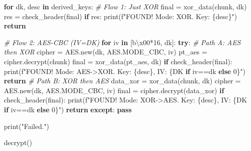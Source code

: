 \documentclass[
]{article}
\newenvironment{Shaded}{}{}
\newcommand{\BuiltInTok}[1]{\textcolor[rgb]{0.00,0.50,0.00}{#1}}
\newcommand{\CharTok}[1]{\textcolor[rgb]{0.25,0.44,0.63}{#1}}
\newcommand{\CommentTok}[1]{\textcolor[rgb]{0.38,0.63,0.69}{\textit{#1}}}
\newcommand{\ControlFlowTok}[1]{\textcolor[rgb]{0.00,0.44,0.13}{\textbf{#1}}}
\newcommand{\DecValTok}[1]{\textcolor[rgb]{0.25,0.63,0.44}{#1}}
\newcommand{\KeywordTok}[1]{\textcolor[rgb]{0.00,0.44,0.13}{\textbf{#1}}}
\newcommand{\NormalTok}[1]{#1}
\newcommand{\OperatorTok}[1]{\textcolor[rgb]{0.40,0.40,0.40}{#1}}
\newcommand{\SpecialCharTok}[1]{\textcolor[rgb]{0.25,0.44,0.63}{#1}}
\newcommand{\SpecialStringTok}[1]{\textcolor[rgb]{0.73,0.40,0.53}{#1}}
\newcommand{\StringTok}[1]{\textcolor[rgb]{0.25,0.44,0.63}{#1}}
\begin{document}
\begin{Shaded}
\begin{Highlighting}[]
    \ControlFlowTok{for}\NormalTok{ dk, desc }\KeywordTok{in}\NormalTok{ derived\_keys:}
        \CommentTok{\# Flow 1: Just XOR}
\NormalTok{        final }\OperatorTok{=}\NormalTok{ xor\_data(chunk, dk)}
\NormalTok{        res }\OperatorTok{=}\NormalTok{ check\_header(final)}
        \ControlFlowTok{if}\NormalTok{ res:}
            \BuiltInTok{print}\NormalTok{(}\SpecialStringTok{f"FOUND! Mode: XOR. Key: }\SpecialCharTok{\{}\NormalTok{desc}\SpecialCharTok{\}}\SpecialStringTok{"}\NormalTok{)}
            \ControlFlowTok{return}
        
        \CommentTok{\# Flow 2: AES{-}CBC (IV=DK)}
        \ControlFlowTok{for}\NormalTok{ iv }\KeywordTok{in}\NormalTok{ [}\StringTok{b\textquotesingle{}}\CharTok{\textbackslash{}x00}\StringTok{\textquotesingle{}}\OperatorTok{*}\DecValTok{16}\NormalTok{, dk]:}
            \ControlFlowTok{try}\NormalTok{:}
                \CommentTok{\# Path A: AES then XOR}
\NormalTok{                cipher }\OperatorTok{=}\NormalTok{ AES.new(dk, AES.MODE\_CBC, iv)}
\NormalTok{                pt\_aes }\OperatorTok{=}\NormalTok{ cipher.decrypt(chunk)}
\NormalTok{                final }\OperatorTok{=}\NormalTok{ xor\_data(pt\_aes, dk)}
                \ControlFlowTok{if}\NormalTok{ check\_header(final):}
                    \BuiltInTok{print}\NormalTok{(}\SpecialStringTok{f"FOUND! Mode: AES{-}\textgreater{}XOR. Key: }\SpecialCharTok{\{}\NormalTok{desc}\SpecialCharTok{\}}\SpecialStringTok{, IV: }\SpecialCharTok{\{}\StringTok{\textquotesingle{}DK\textquotesingle{}} \ControlFlowTok{if}\NormalTok{ iv}\OperatorTok{==}\NormalTok{dk }\ControlFlowTok{else} \StringTok{\textquotesingle{}0\textquotesingle{}}\SpecialCharTok{\}}\SpecialStringTok{"}\NormalTok{)}
                    \ControlFlowTok{return}
                \CommentTok{\# Path B: XOR then AES}
\NormalTok{                data\_xor }\OperatorTok{=}\NormalTok{ xor\_data(chunk, dk)}
\NormalTok{                cipher }\OperatorTok{=}\NormalTok{ AES.new(dk, AES.MODE\_CBC, iv)}
\NormalTok{                final }\OperatorTok{=}\NormalTok{ cipher.decrypt(data\_xor)}
                \ControlFlowTok{if}\NormalTok{ check\_header(final):}
                    \BuiltInTok{print}\NormalTok{(}\SpecialStringTok{f"FOUND! Mode: XOR{-}\textgreater{}AES. Key: }\SpecialCharTok{\{}\NormalTok{desc}\SpecialCharTok{\}}\SpecialStringTok{, IV: }\SpecialCharTok{\{}\StringTok{\textquotesingle{}DK\textquotesingle{}} \ControlFlowTok{if}\NormalTok{ iv}\OperatorTok{==}\NormalTok{dk }\ControlFlowTok{else} \StringTok{\textquotesingle{}0\textquotesingle{}}\SpecialCharTok{\}}\SpecialStringTok{"}\NormalTok{)}
                    \ControlFlowTok{return}
            \ControlFlowTok{except}\NormalTok{: }\ControlFlowTok{pass}

    \BuiltInTok{print}\NormalTok{(}\StringTok{"Failed."}\NormalTok{)}

\NormalTok{decrypt()}
\end{Highlighting}
\end{Shaded}
\end{document}
